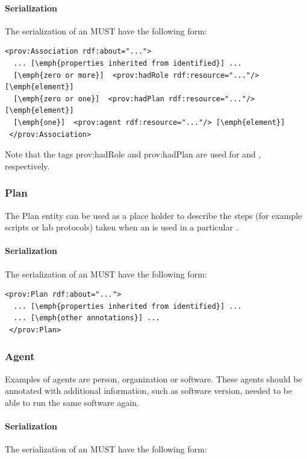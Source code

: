 \paragraph{Serialization}
The serialization of an  MUST have the following form:


\begin{lstlisting}
<prov:Association rdf:about="...">
  ... [\emph{properties inherited from identified}] ...
  [\emph{zero or more}]  <prov:hadRole rdf:resource="..."/> [\emph{element}]
  [\emph{zero or one}]  <prov:hadPlan rdf:resource="..."/> [\emph{element}]
  [\emph{one}]  <prov:agent rdf:resource="..."/> [\emph{element}]
 </prov:Association>
\end{lstlisting}

Note that the tags prov:hadRole and prov:hadPlan are used for  and , respectively.


\subsubsection{Plan}
\label{sec:Plan}

 The Plan entity can be used as a place holder to describe the steps (for example scripts or lab protocols) taken when an  is used in a particular . 

\paragraph{Serialization}
The serialization of an  MUST have the following form:


\begin{lstlisting}
<prov:Plan rdf:about="...">
  ... [\emph{properties inherited from identified}] ...
  ... [\emph{other annotations}] ...
 </prov:Plan>
\end{lstlisting}

\subsubsection{Agent}
\label{sec:Agent}

 Examples of agents are person, organization or software. These agents should be annotated with additional information, such as software version, needed to be able to run the same software again.

\paragraph{Serialization}
The serialization of an  MUST have the following form:


